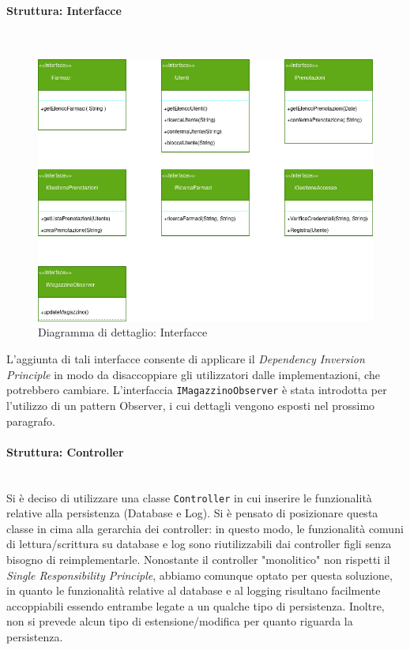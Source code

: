 
\paragraph{Struttura: Interfacce}\mbox{}\\

\begin{figure}[h!]
    \begin{center}
        \includegraphics[width=\textwidth]{immagini/Interfacce-progettazione.png}
        \caption{Diagramma di dettaglio: Interfacce}
    \end{center}
\end{figure}

L'aggiunta di tali interfacce consente di applicare il \textit{Dependency Inversion Principle}
in modo da disaccoppiare gli utilizzatori dalle implementazioni, che potrebbero cambiare.
L'interfaccia \texttt{IMagazzinoObserver} è stata introdotta per l'utilizzo di un pattern Observer,
i cui dettagli vengono esposti nel prossimo paragrafo.

\newpage

\paragraph{Struttura: Controller}\mbox{}\\

Si è deciso di utilizzare una classe \texttt{Controller} in cui inserire le funzionalità relative alla persistenza (Database e Log).
Si è pensato di posizionare questa classe in cima alla gerarchia dei controller: 
in questo modo, le funzionalità comuni di lettura/scrittura su database e log sono riutilizzabili dai controller figli senza bisogno di reimplementarle.
Nonostante il controller "monolitico" non rispetti il \textit{Single Responsibility Principle}, 
abbiamo comunque optato per questa soluzione, in quanto le funzionalità relative al database e al logging risultano facilmente accoppiabili essendo entrambe legate a un qualche tipo di persistenza.
Inoltre, non si prevede alcun tipo di estensione/modifica per quanto riguarda la persistenza.

